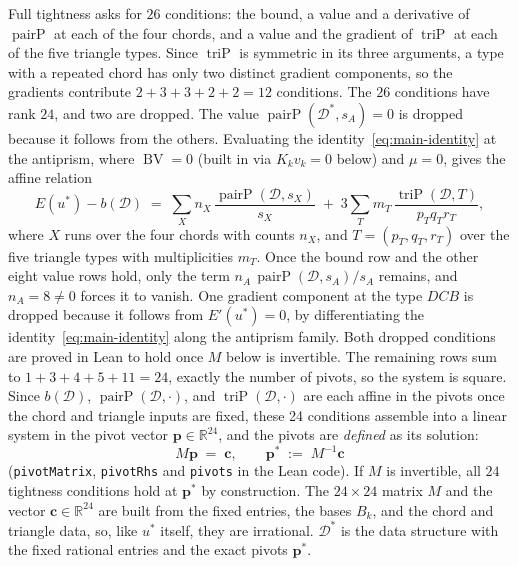 \documentclass[11pt]{article}
\theoremstyle{definition}
\theoremstyle{remark}
\newcommand{\RR}{\mathbb{R}}
\newcommand{\energy}{E}
\newcommand{\pairP}{\operatorname{pairP}}
\newcommand{\triP}{\operatorname{triP}}
\newcommand{\BV}{\operatorname{BV}}
\begin{document}
Full tightness asks for $26$ conditions: the bound, a value and a
derivative of $\pairP$ at each of the four chords, and a value and the
gradient of $\triP$ at each of the five triangle types. Since $\triP$ is
symmetric in its three arguments, a type with a repeated chord has only
two distinct gradient components, so the gradients contribute
$2+3+3+2+2=12$ conditions. The $26$ conditions have rank $24$, and two are
dropped. The value $\pairP(\mathcal{D}^*,s_A)=0$ is dropped because it follows
from the others. Evaluating the identity~\eqref{eq:main-identity} at the
antiprism, where $\BV=0$ (built in via $K_kv_k=0$ below) and $\mu=0$,
gives the affine relation
\begin{equation}
  \energy(u^*) - b(\mathcal{D}) \;=\; \sum_{X} n_X\,\frac{\pairP(\mathcal{D},s_X)}{s_X}
  \;+\; 3\sum_{T} m_T\,\frac{\triP(\mathcal{D},T)}{p_Tq_Tr_T},
\end{equation}
where $X$ runs over the four chords with counts $n_X$, and $T=(p_T,q_T,r_T)$
over the five triangle types with multiplicities $m_T$. Once the bound
row and the other eight value rows hold, only the term $n_A\,\pairP(\mathcal{D},s_A)/s_A$
remains, and $n_A=8\ne0$ forces it to vanish. One gradient component
at the type $DCB$ is dropped because it follows from
$\energy'(u^*)=0$, by differentiating the identity~\eqref{eq:main-identity}
along the antiprism family. Both dropped conditions are proved in Lean to
hold once $M$ below is invertible. The remaining rows sum to
$1+3+4+5+11=24$, exactly the number of pivots, so the system is square.
Since $b(\mathcal{D})$, $\pairP(\mathcal{D},\cdot)$, and
$\triP(\mathcal{D},\cdot)$ are each affine in the pivots once the chord and
triangle inputs are fixed, these 24 conditions assemble into a linear
system in the pivot vector $\mathbf{p}\in\RR^{24}$, and the pivots are
\emph{defined} as its solution:
\begin{equation}
  M\mathbf{p} \;=\; \mathbf{c}, \qquad
  \mathbf{p}^* \;:=\; M^{-1}\mathbf{c}
\end{equation}
(\texttt{pivotMatrix}, \texttt{pivotRhs} and \texttt{pivots} in the Lean
code).
If $M$ is invertible, all $24$ tightness conditions hold at
$\mathbf{p}^*$ by construction. The
$24\times24$ matrix $M$ and the vector $\mathbf{c}\in\RR^{24}$ are built
from the fixed entries, the bases $B_k$, and the chord and triangle data,
so, like $u^*$ itself, they are irrational. $\mathcal{D}^*$ is the data
structure with the fixed rational entries and the exact pivots $\mathbf{p}^*$.
\end{document}
